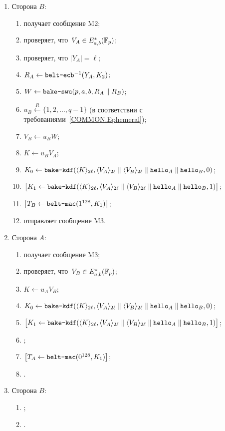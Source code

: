 \begin{enumerate}
\item
Сторона $B$:
\begin{enumerate}
\item
получает сообщение M2;
\item
проверяет, что~$V_A\in E_{a,b}^*(\mathbb{F}_p)$;
\item
проверяет, что $|Y_A|=\ell$;
\item
$R_A\leftarrow \texttt{belt-ecb}^{-1}(Y_A,K_2)$;
\item
$W\leftarrow\texttt{bake-swu}(p,a,b,R_A\parallel R_B)$;
\item
$u_B\stackrel{R}{\leftarrow}\{1,2,\ldots,q-1\}$
(в соответствии с требованиями~\ref{COMMON.Ephemeral});
\item
$V_B\leftarrow u_B W$;
\item
$K\leftarrow u_B V_A$;
\item
$K_0\leftarrow\texttt{bake-kdf}
(\langle K\rangle_{2\ell},
\langle V_A\rangle_{2\ell}\parallel
\langle V_B\rangle_{2\ell}\parallel
\texttt{hello}_A\parallel\texttt{hello}_B,
0)$;
\item
$\mathbf{\bigl[}K_1\leftarrow\texttt{bake-kdf}
(\langle K\rangle_{2\ell},
\langle V_A\rangle_{2\ell}\parallel
\langle V_B\rangle_{2\ell}\parallel
\texttt{hello}_A\parallel\texttt{hello}_B,
1)\mathbf{\bigr]}$;
\item
$\mathbf{\bigl[}T_B\leftarrow\texttt{belt-mac}(1^{128}, K_1)\mathbf{\bigr]}$;
\item
отправляет сообщение M3.
\end{enumerate}

\item
Сторона $A$:
\begin{enumerate}
\item
получает сообщение M3;
\item
проверяет, что~$V_B\in E_{a,b}^*(\mathbb{F}_p)$;
\item
$K\leftarrow u_A V_B$;
\item
$K_0\leftarrow\texttt{bake-kdf}
(\langle K\rangle_{2\ell},
\langle V_A\rangle_{2\ell}\parallel
\langle V_B\rangle_{2\ell}\parallel
\texttt{hello}_A\parallel\texttt{hello}_B,
0)$;
\item
$\mathbf{\bigl[}K_1\leftarrow\texttt{bake-kdf}
(\langle K\rangle_{2\ell},
\langle V_A\rangle_{2\ell}\parallel
\langle V_B\rangle_{2\ell}\parallel
\texttt{hello}_A\parallel\texttt{hello}_B,
1)\mathbf{\bigr]}$;
\item
{};
\item
$\mathbf{\bigl[}T_A\leftarrow\texttt{belt-mac}(0^{128}, K_1)\mathbf{\bigr]}$;
\item
{}.
\end{enumerate}

\item
Сторона $B$:
\begin{enumerate}
\item
{};
\item
{}.
\end{enumerate}
\end{enumerate}

